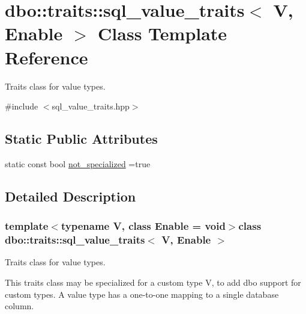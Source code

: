 \hypertarget{structdbo_1_1traits_1_1sql__value__traits}{\section{dbo\+:\+:traits\+:\+:sql\+\_\+value\+\_\+traits$<$ V, Enable $>$ Class Template Reference}
\label{structdbo_1_1traits_1_1sql__value__traits}
}


Traits class for value types.  




{\ttfamily \#include $<$sql\+\_\+value\+\_\+traits.\+hpp$>$}

\subsection*{Static Public Attributes}
\begin{DoxyCompactItemize}
\item 
static const bool \hyperlink{structdbo_1_1traits_1_1sql__value__traits_ac05f51eeec8be981aa7be0aac21858be}{not\+\_\+specialized} =true
\end{DoxyCompactItemize}


\subsection{Detailed Description}
\subsubsection*{template$<$typename V, class Enable = void$>$class dbo\+::traits\+::sql\+\_\+value\+\_\+traits$<$ V, Enable $>$}

Traits class for value types. 

This traits class may be specialized for a custom type {\ttfamily V}, to add dbo support for custom types. A value type has a one-\/to-\/one mapping to a single database column.

